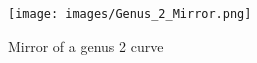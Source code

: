 \documentclass[../main.tex]{subfiles}
\begin{document}
\begin{figure}[h!]
\centering
    \texttt{[image: images/Genus\_2\_Mirror.png]}
    \caption{Mirror of a genus 2 curve}
    \label{g2mirror}
\end{figure}


%
%
%








\end{document}
